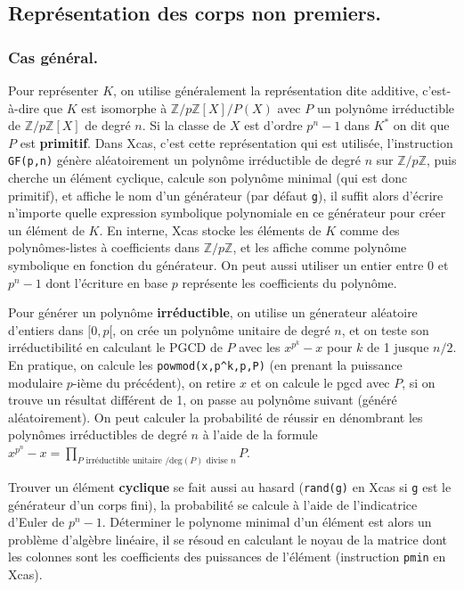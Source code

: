 \documentclass[a4paper,11pt]{article}
\begin{document}
\begin{giacjshere}
\subsection{Repr\'esentation des corps non premiers.}
\subsubsection{Cas g\'en\'eral.}
Pour repr\'esenter $K$, on utilise g\'en\'eralement la
repr\'esentation dite additive, c'est-\`a-dire que $K$
est isomorphe \`a $\mathbb{Z}/p\mathbb{Z}[X]/P(X)$ avec $P$ un polyn\^ome
irr\'eductible de $\mathbb{Z}/p\mathbb{Z}[X]$ de degr\'e $n$. Si la classe de $X$
est d'ordre $p^n-1$ dans $K^*$ on dit que $P$ est {\bf primitif}.
Dans Xcas, c'est cette repr\'esentation qui est utilis\'ee,
l'instruction \verb|GF(p,n)| g\'en\`ere al\'eatoirement
un polyn\^ome irr\'eductible de degr\'e $n$ sur $\mathbb{Z}/p\mathbb{Z}$,
puis cherche un \'el\'ement cyclique, calcule son polyn\^ome
minimal (qui est donc primitif), et affiche le nom d'un
g\'en\'erateur (par d\'efaut \verb|g|), 
il suffit alors d'\'ecrire n'importe quelle
expression symbolique polynomiale en ce g\'en\'erateur
pour cr\'eer un \'el\'ement de $K$. En interne, Xcas stocke
les \'el\'ements de $K$ comme des polyn\^omes-listes
\`a coefficients dans $\mathbb{Z}/p\mathbb{Z}$, et les affiche comme polyn\^ome
symbolique en fonction du g\'en\'erateur. On peut aussi
utiliser un entier entre 0 et $p^n-1$ dont l'\'ecriture en base
$p$ repr\'esente les coefficients du polyn\^ome.

Pour g\'en\'erer un polyn\^ome {\bf irr\'eductible}, on utilise
un g\'enerateur al\'eatoire d'entiers dans $[0,p[$,
on cr\'ee un polyn\^ome unitaire de degr\'e $n$, et
on teste son irr\'eductibilit\'e en calculant le PGCD
de $P$ avec les $x^{p^k}-x$ pour $k$ de 1 jusque $n/2$.
En pratique, on calcule les \verb|powmod(x,p^k,p,P)|
(en prenant la puissance modulaire $p$-i\`eme
du pr\'ec\'edent), on retire $x$ et on calcule le pgcd avec $P$,
si on trouve un r\'esultat diff\'erent de 1, on passe au polyn\^ome
suivant (g\'en\'er\'e al\'eatoirement).
On peut calculer la probabilit\'e de r\'eussir en d\'enombrant
les polyn\^omes irr\'eductibles de degr\'e $n$ \`a l'aide
de la formule $x^{p^n}-x=\prod_{P \mbox{ irréductible unitaire }/ \mbox{deg}(P)\mbox{ divise } n} P$.

Trouver un \'el\'ement {\bf cyclique} se fait aussi au hasard
(\verb|rand(g)| en Xcas si \verb|g| est le g\'en\'erateur
d'un corps fini), la
probabilit\'e se calcule \`a l'aide de l'indicatrice d'Euler de
$p^n-1$. D\'eterminer le polynome minimal d'un \'el\'ement
est alors un probl\`eme d'alg\`ebre lin\'eaire, il se r\'esoud
en calculant le noyau de la matrice dont les colonnes sont
les coefficients des puissances de l'\'el\'ement (instruction
\verb|pmin| en Xcas).


\end{giacjshere}
\end{document}
